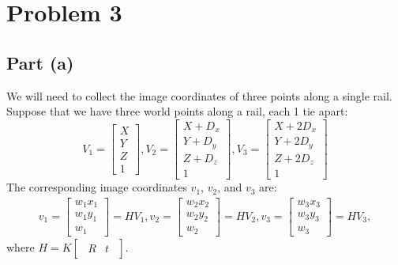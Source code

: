 \documentclass[12pt]{article}
\begin{document}


\section*{Problem 3}

\subsection*{Part (a)}

We will need to collect the image coordinates of three points along a single
rail. Suppose that we have three world points along a rail, each 1 tie apart:
%
\begin{equation}
    V_1 = \begin{bmatrix} X \\ Y \\ Z \\ 1 \end{bmatrix},
    V_2 = \begin{bmatrix} X + D_x \\ Y + D_y \\ Z + D_z \\ 1 \end{bmatrix},
    V_3 = \begin{bmatrix} X + 2 D_x \\ Y + 2 D_y \\ Z + 2 D_z \\ 1 \end{bmatrix}
\end{equation}
%
The corresponding image coordinates $v_1$, $v_2$, and $v_3$ are:
%
\begin{align}
    v_1 = \begin{bmatrix}w_1 x_1 \\ w_1 y_1 \\ w_1 \end{bmatrix} = H V_1,
    v_2 = \begin{bmatrix}w_2 x_2 \\ w_2 y_2 \\ w_2 \end{bmatrix} = H V_2,
    v_3 = \begin{bmatrix}w_3 x_3 \\ w_3 y_3 \\ w_3 \end{bmatrix} = H V_3,
\end{align}
%
where $H = K \begin{bmatrix} \begin{array}{c|c} R  & t \end{array} \end{bmatrix}$.
\end{document}
